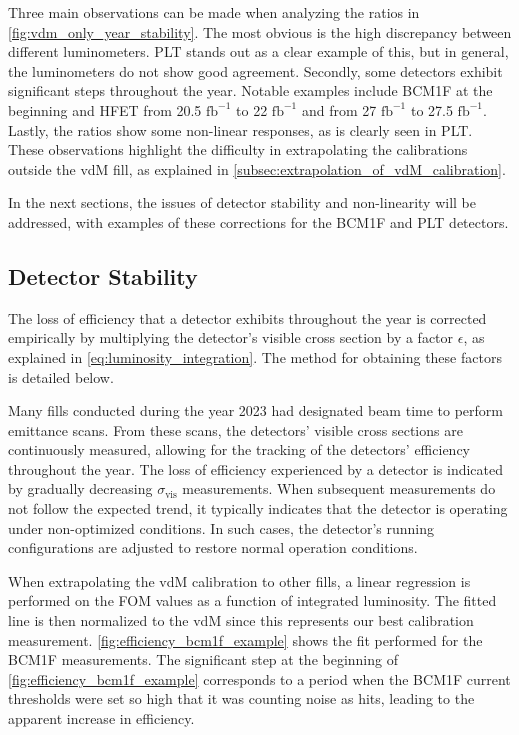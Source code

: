 Three main observations can be made when analyzing the ratios in \autoref{fig:vdm_only_year_stability}. The most obvious is the high discrepancy between different luminometers. PLT stands out as a clear example of this, but in general, the luminometers do not show good agreement. Secondly, some detectors exhibit significant steps throughout the year. Notable examples include BCM1F at the beginning and HFET from 20.5 $\text{fb}^{-1}$ to 22 $\text{fb}^{-1}$ and from 27 $\text{fb}^{-1}$ to 27.5 $\text{fb}^{-1}$. Lastly, the ratios show some non-linear responses, as is clearly seen in PLT. These observations highlight the difficulty in extrapolating the calibrations outside the vdM fill, as explained in \autoref{subsec:extrapolation_of_vdM_calibration}.

In the next sections, the issues of detector stability and non-linearity will be addressed, with examples of these corrections for the BCM1F and PLT detectors.

\subsection{Detector Stability}

The loss of efficiency that a detector exhibits throughout the year is corrected empirically by multiplying the detector's visible cross section by a factor \(\epsilon\), as explained in \autoref{eq:luminosity_integration}. The method for obtaining these factors is detailed below.

Many fills conducted during the year 2023 had designated beam time to perform emittance scans. From these scans, the detectors' visible cross sections are continuously measured, allowing for the tracking of the detectors' efficiency throughout the year. The loss of efficiency experienced by a detector is indicated by gradually decreasing \(\sigma_{\mathrm{vis}}\) measurements. When subsequent measurements do not follow the expected trend, it typically indicates that the detector is operating under non-optimized conditions. In such cases, the detector's running configurations are adjusted to restore normal operation conditions.

When extrapolating the vdM calibration to other fills, a linear regression is performed on the FOM values as a function of integrated luminosity. The fitted line is then normalized to the vdM since this represents our best calibration measurement. \autoref{fig:efficiency_bcm1f_example} shows the fit performed for the BCM1F measurements. The significant step at the beginning of \autoref{fig:efficiency_bcm1f_example} corresponds to a period when the BCM1F current thresholds were set so high that it was counting noise as hits, leading to the apparent increase in efficiency.

